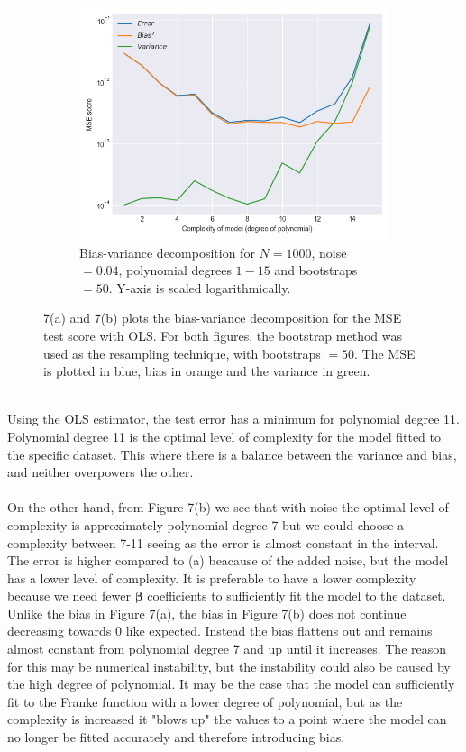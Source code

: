 \documentclass[a4paper,twocolumn]{article}
\newcommand{\B}{\boldsymbol{\beta}}
\begin{document}
\begin{figure}[ht]
    \begin{subfigure}[b]{0.9\columnwidth}
        \includegraphics[width=\columnwidth]{bias_variance_tradeoff_Bootstraps=50_N=1000_Noise=0.04_Degree=1-15.png}
        \caption{Bias-variance decomposition for $N = 1000$, noise $= 0.04$, polynomial degrees $1- 15$ and bootstraps $= 50$. Y-axis is scaled logarithmically.}
    \end{subfigure}
    \caption{7(a) and 7(b) plots the bias-variance decomposition for the MSE test score with OLS. For both figures, the bootstrap method was used as the resampling technique, with bootstraps $= 50$. The MSE is plotted in blue, bias in orange and the variance in green. }
\end{figure}\\
Using the OLS estimator, the test error has a minimum for polynomial degree 11. Polynomial degree 11 is the optimal level of complexity for the model fitted to the specific dataset. This where there is a balance between the variance and bias, and neither overpowers the other. \\
\\
On the other hand, from Figure 7(b) we see that with noise the optimal level of complexity is approximately polynomial degree 7 but we could choose a complexity between 7-11 seeing as the error is almost constant in the interval. The error is higher compared to (a) beacause of the added noise, but the model has a lower level of complexity. It is preferable to have a lower complexity because we need fewer $\B$ coefficients to sufficiently fit the model to the dataset.\\
Unlike the bias in Figure 7(a), the bias in Figure 7(b) does not continue decreasing towards 0 like expected. Instead the bias flattens out and remains almost constant from polynomial degree 7 and up until it increases. The reason for this may be numerical instability, but the instability could also be caused by the high degree of polynomial. It may be the case that the model can sufficiently fit to the Franke function with a lower degree of polynomial, but as the complexity is increased it "blows up" the values to a point where the model can no longer be fitted accurately and therefore introducing bias.\\
\end{document}
